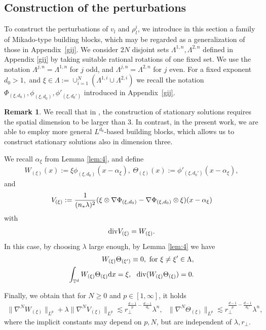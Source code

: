 \documentclass[UTF-8,reqno]{amsart}
\numberwithin{equation}{section}
\theoremstyle{definition}
\newtheorem{remark}[theorem]{Remark}
\def\dif{{\mathord{{\rm d}}}}
\def\geq{\geqslant}
\def\div{\mathord{{\rm div}}}
\def\dif{{\mathord{{\rm d}}}}
\def\br{\begin{remark}}
\def\er{\end{remark}}
\def\geq{\geqslant}
\def\div{\mathord{{\rm div}}}
\begin{document}
 \subsection{Construction of the perturbations}\label{sec:5defq+1}
To construct the perturbations of $v_l$ and $\rho^i_l$, we introduce in this section a family of Mikado-type building blocks, which may be regarded as a generalization of those in Appendix~\ref{gij}.   We consider $2N$ disjoint sets $\Lambda^{1,n}, \Lambda^{2,n}$ defined in Appendix \ref{gij} by taking suitable rational rotations of one fixed set. We use the notation   $ \Lambda^{j,n} =  \Lambda^{1,n}$ for $j$ odd, and $ \Lambda^{j,n} =  \Lambda^{2,n}$ for $j$ even. 
For a fixed exponent
$
d_0>1,
$ and $\xi\in\Lambda:=\cup_{i=1}^N(\Lambda^{1,i}\cup \Lambda^{2,i})$
we   recall the notation
$
\Phi_{(\xi,d_0)},
\phi_{(\xi,d_0)},
\phi'_{(\xi,d_0')}
$
introduced in Appendix~\ref{gij}. 

\br
We recall that in \cite{Luo19}, the construction of stationary solutions requires the spatial dimension to be  larger than 3. 
In contrast, in the present work, we are able to employ more general $L^{d_0}$-based building blocks, which allows us to construct stationary solutions  also in dimension three.

\er

We  recall $\alpha_\xi$ from Lemma \ref{lem:4}, and  define 
 \begin{align*}
    W_{(\xi)}(x):=\xi\phi_{(\xi,d_0)}(x-\alpha_\xi),\ 
    \Theta_{ (\xi)}(x):=\phi'_{(\xi,d_0')}(x-\alpha_\xi),
\end{align*} 
 and 
\begin{align}
V_{(\xi)}:=\frac{1}{(n_*\lambda)^2}(\xi\otimes\nabla\Phi_{(\xi,d_0)}-\nabla\Phi_{(\xi,d_0)}\otimes\xi)(x-\alpha_\xi)\notag
\end{align}
with
\begin{align}
\div V_{(\xi)}
=W_{(\xi)} .\label{5:divOmega}
\end{align} 
In this case, by choosing $\lambda$ large enough, by Lemma \ref{lem:4} we have
\begin{align}
  W_{(\xi)}\Theta_{(\xi')}\equiv 0,\ {\rm for}\ \xi\neq\xi'\in\Lambda,\label{bd:wtheta0}\\
\int _{\mathbb{T}^d}W_{(\xi)}\Theta_{(\xi)}\dif x=\xi,\ \ \div (W_{(\xi)}\Theta_{(\xi)})=0.\notag
\end{align}

Finally, we obtain that for $N\geq 0$ and $p\in [1, \infty]$, it holds 
\begin{align}
\|\nabla^NW_{(\xi)}\|_{L^p }+\lambda\|\nabla^NV_{(\xi)}\|_{L^p }
\lesssim r_\perp^{\frac{d-1}{p}-\frac{d-1}{d_0}}\lambda^{n}, \ \ \ \|\nabla^N\Theta_{(\xi)}\|_{L^p }\lesssim r_\perp^{\frac{d-1}{p}-\frac{d-1}{d_0'}}\lambda^{n},& \label{5:int4theta}
\end{align}
where the implicit constants may depend on $p,N$, but are independent of $\lambda,r_\perp$. 
\end{document}
